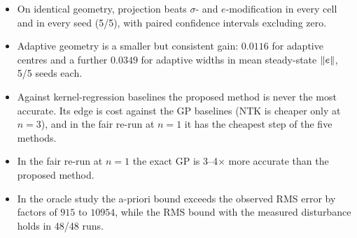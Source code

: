 \begin{itemize}
\item On identical geometry, projection beats $\sigma$- and $e$-modification in every cell and in every seed (5/5),
  with paired confidence intervals excluding zero.
\item Adaptive geometry is a smaller but consistent gain: $0.0116$ for adaptive centres and a further $0.0349$ for
  adaptive widths in mean steady-state $\lVert e\rVert$, 5/5 seeds each.
\item Against kernel-regression baselines the proposed method is never the most accurate. Its edge is cost against the
  GP baselines (NTK is cheaper only at $n=3$), and in the fair re-run at $n=1$ it has the cheapest step of the five
  methods.
\item In the fair re-run at $n=1$ the exact GP is 3--4$\times$ more accurate than the proposed method.
\item In the oracle study the a-priori bound exceeds the observed RMS error by factors of $915$ to $10954$, while the
  RMS bound with the measured disturbance holds in 48/48 runs.
\end{itemize}
